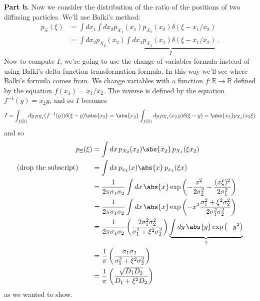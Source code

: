 \textbf{Part b.} Now we consider the distribution of the ratio of the positions of two diffusing particles.
We'll use Balki's method:
\begin{align*}
  p_\Xi(\xi)
  &= \int dx_1 \int dx_2 p_{X_1}(x_1) p_{X_2}(x_2) \delta ( \xi - x_1 / x_2) \\
  &= \int dx_2 p_{X_2}(x_2) \underbrace{\int dx_1 p_{X_1}(x_1) \delta ( \xi - x_1 / x_2)}_I
  \, .
\end{align*}
Now to compute $I$, we're going to use the change of variables formula instead of using Balki's delta function transformation formula.
In this way we'll see where Balki's formula comes from.
We change variables with a function $f:\mathbb{R} \rightarrow \mathbb{R}$ defined by the equation $f(x_1) = x_1/x_2$.
The inverse is defined by the equation $f^{-1}(y) = x_2 y$, and so $I$ becomes
\begin{equation*}
  I
  =\int_{f(\mathbb{R})} dy \, p_{X_1}(f^{-1}(y)) \delta(\xi - y) \abs{x_2}
  = \abs{x_2} \int_{f(\mathbb{R})} dy \, p_{X_1}(x_2 \, y) \delta(\xi - y)
  = \abs{x_2} p_{X_1}(x_2 \xi)
\end{equation*}
and so
\begin{align*}
  p_\Xi(\xi)
  &= \int dx \, p_{X_2}(x_2) \abs{x_2} \, p_{X_1}(\xi x_2) \\
  \text{(drop the subscript)} \qquad
  &= \int dx \, p_{x_2}(x) \abs{x} \, p_{x_1}(\xi x) \\
  &= \frac{1}{2 \pi \sigma_1 \sigma_2} \int dx \, \abs{x} \exp \left(
    - \frac{x^2}{2 \sigma_2^2} - \frac{(x \xi)^2}{2 \sigma_1^2}
  \right) \\
  &= \frac{1}{2 \pi \sigma_1 \sigma_2} \int dx \, \abs{x} \exp \left(
    - x^2 \frac{\sigma_1^2 + \xi^2 \sigma_2^2}{2 \sigma_1^2 \sigma_2^2}
  \right) \\
  &= \frac{1}{2 \pi \sigma_1 \sigma_2}
    \left( \frac{2 \sigma_1^2 \sigma_2^2}{\sigma_1^2 + \xi^2 \sigma_2^2} \right)
    \underbrace{\int dy \, \abs{y} \exp \left(- y^2 \right)}_1 \\
  &= \frac{1}{\pi}
    \left( \frac{\sigma_1 \sigma_2}{\sigma_1^2 + \xi^2 \sigma_2^2} \right) \\
  &= \frac{1}{\pi}
    \left( \frac{\sqrt{D_1 D_2}}{D_1 + \xi^2 D_2} \right)
\end{align*}
as we wanted to show.

